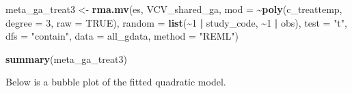 \documentclass[
]{article}
\newenvironment{Shaded}{\begin{snugshade}}{\end{snugshade}}
\newcommand{\AttributeTok}[1]{\textcolor[rgb]{0.13,0.29,0.53}{#1}}
\newcommand{\CommentTok}[1]{\textcolor[rgb]{0.56,0.35,0.01}{\textit{#1}}}
\newcommand{\ConstantTok}[1]{\textcolor[rgb]{0.56,0.35,0.01}{#1}}
\newcommand{\DecValTok}[1]{\textcolor[rgb]{0.00,0.00,0.81}{#1}}
\newcommand{\FloatTok}[1]{\textcolor[rgb]{0.00,0.00,0.81}{#1}}
\newcommand{\FunctionTok}[1]{\textcolor[rgb]{0.13,0.29,0.53}{\textbf{#1}}}
\newcommand{\NormalTok}[1]{#1}
\newcommand{\OtherTok}[1]{\textcolor[rgb]{0.56,0.35,0.01}{#1}}
\newcommand{\SpecialCharTok}[1]{\textcolor[rgb]{0.81,0.36,0.00}{\textbf{#1}}}
\newcommand{\StringTok}[1]{\textcolor[rgb]{0.31,0.60,0.02}{#1}}
\begin{document}
\begin{Shaded}
\end{Shaded}

\begin{Shaded}
\begin{Highlighting}[]
\NormalTok{meta\_ga\_treat3 }\OtherTok{\textless{}{-}} \FunctionTok{rma.mv}\NormalTok{(es, VCV\_shared\_ga, }\AttributeTok{mod =} \SpecialCharTok{\textasciitilde{}}\FunctionTok{poly}\NormalTok{(c\_treattemp,}
    \AttributeTok{degree =} \DecValTok{3}\NormalTok{, }\AttributeTok{raw =} \ConstantTok{TRUE}\NormalTok{), }\AttributeTok{random =} \FunctionTok{list}\NormalTok{(}\SpecialCharTok{\textasciitilde{}}\DecValTok{1} \SpecialCharTok{|}\NormalTok{ study\_code, }\SpecialCharTok{\textasciitilde{}}\DecValTok{1} \SpecialCharTok{|}
\NormalTok{    obs), }\AttributeTok{test =} \StringTok{"t"}\NormalTok{, }\AttributeTok{dfs =} \StringTok{"contain"}\NormalTok{, }\AttributeTok{data =}\NormalTok{ all\_gdata, }\AttributeTok{method =} \StringTok{"REML"}\NormalTok{)}
\end{Highlighting}
\end{Shaded}

\begin{Shaded}
\begin{Highlighting}[]
\FunctionTok{summary}\NormalTok{(meta\_ga\_treat3)}
\end{Highlighting}
\end{Shaded}

\newpage

Below is a bubble plot of the fitted quadratic model.
\end{document}
